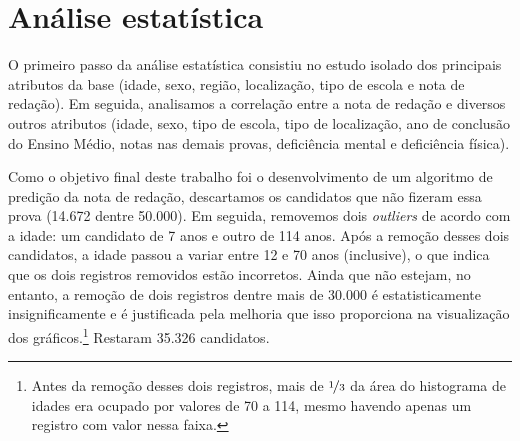 \documentclass[12pt]{article}
\newcommand{\reffig}[1]{Fig.~\ref{fig:#1}}
\begin{document}
\section{Análise estatística}
\label{sec:analise-estatistica}
O primeiro passo da análise estatística consistiu no estudo isolado dos principais atributos da base (idade, sexo, região, localização, tipo de escola e nota de redação).
Em seguida, analisamos a correlação entre a nota de redação e diversos outros atributos (idade, sexo, tipo de escola, tipo de localização, ano de conclusão do Ensino Médio, notas nas demais provas, deficiência mental e deficiência física).

Como o objetivo final deste trabalho foi o desenvolvimento de um algoritmo de predição da nota de redação, descartamos os candidatos que não fizeram essa prova (14.672 dentre 50.000).
Em seguida, removemos dois \emph{outliers} de acordo com a idade: um candidato de 7 anos e outro de 114 anos.
Após a remoção desses dois candidatos, a idade passou a variar entre 12 e 70 anos (inclusive), o que indica que os dois registros removidos estão incorretos.
Ainda que não estejam, no entanto, a remoção de dois registros dentre mais de 30.000 é estatisticamente insignificamente e é justificada pela melhoria que isso proporciona na visualização dos gráficos.\footnote{Antes da remoção desses dois registros, mais de $\nicefrac{1}{3}$ da área do histograma de idades era ocupado por valores de 70 a 114, mesmo havendo apenas um registro com valor nessa faixa.}
Restaram 35.326 candidatos.

\end{document}
